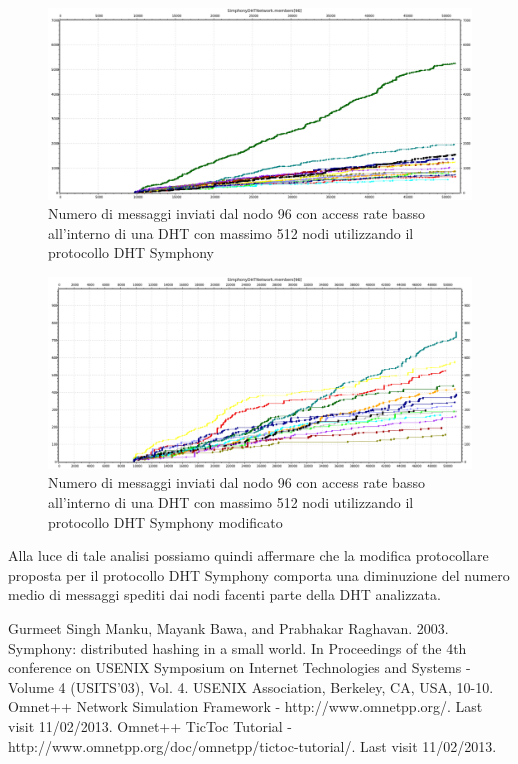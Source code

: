 \documentclass[	
	DIV=calc,
	paper=a4,
	fontsize=11pt,
	onecolumn
]{scrartcl} %
\begin{document}
	\begin{figure}[H]
		\centering
		\includegraphics[scale=0.35]	{SymphonyDHT/plots/MessagesSentByEveryNode/512_Nodes_SlowAccess/SymphonyDHT_512Nodes_SlowAccess_Node96.png}
		\caption{Numero di messaggi inviati dal nodo 96 con access rate basso all'interno di una DHT con massimo 512 nodi utilizzando il protocollo DHT Symphony}
		\label{Figura 42}
	\end{figure}
	\begin{figure}[H]
		\centering
		\includegraphics[scale=0.35]	{SymphonyDHTMod/plots/MessagesSentByEveryNode/512_Nodes_SlowAccess/SymphonyDHTMod_512Nodes_SlowAccess_Node96.png}
		\caption{Numero di messaggi inviati dal nodo 96 con access rate basso all'interno di una DHT con massimo 512 nodi utilizzando il protocollo DHT Symphony modificato}
		\label{Figura 43}
	\end{figure}				
			
	Alla luce di tale analisi possiamo quindi affermare che la modifica protocollare proposta per il protocollo DHT Symphony comporta una diminuzione del numero medio di messaggi spediti dai nodi facenti parte della DHT analizzata.
	
\begin{thebibliography}{20}
	 Gurmeet Singh Manku, Mayank Bawa, and Prabhakar Raghavan. 2003. Symphony: distributed hashing in a small world. In Proceedings of the 4th conference on USENIX Symposium on Internet Technologies and Systems - Volume 4 (USITS'03), Vol. 4. USENIX Association, Berkeley, CA, USA, 10-10.
	 Omnet++ Network Simulation Framework - http://www.omnetpp.org/. Last visit 11/02/2013. 
	 Omnet++ TicToc Tutorial - http://www.omnetpp.org/doc/omnetpp/tictoc-tutorial/. Last visit 11/02/2013.
\end{thebibliography}
\end{document}
